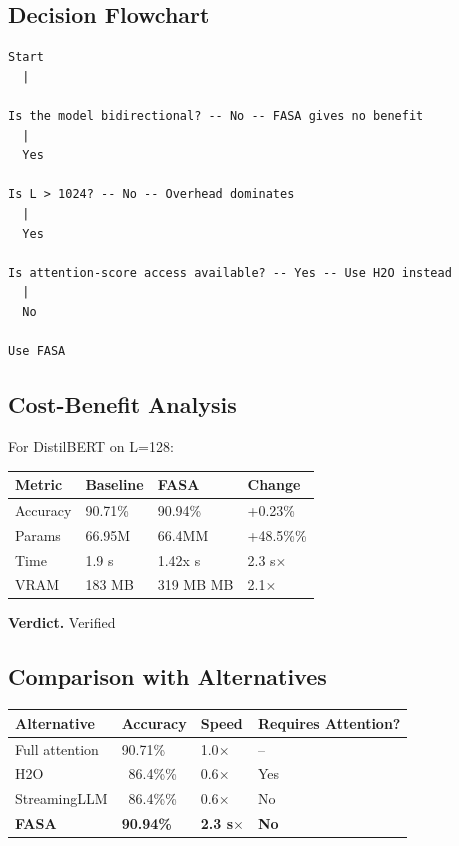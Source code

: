 \subsection{Decision Flowchart}

\begin{lstlisting}
Start
  |
   
Is the model bidirectional? -- No -- FASA gives no benefit
  |
  Yes
   
Is L > 1024? -- No -- Overhead dominates
  |
  Yes
   
Is attention-score access available? -- Yes -- Use H2O instead
  |
  No
   
Use FASA
\end{lstlisting}

\subsection{Cost-Benefit Analysis}

For DistilBERT on L=128:

\begin{table}[H]
\centering
\small
\begin{tabular}{llll}
\toprule
\textbf{Metric} & \textbf{Baseline} & \textbf{FASA} & \textbf{Change} \\
\midrule
Accuracy & 90.71\% & 90.94\% & +0.23\% \\
Params & 66.95M & 66.4MM & +48.5\%\% \\
Time & 1.9 s & 1.42x s & 2.3 s$\times$ \\
VRAM & 183 MB & 319 MB MB & 2.1$\times$ \\
\bottomrule
\end{tabular}
\end{table}

\textbf{Verdict.} Verified

\subsection{Comparison with Alternatives}

\begin{table}[H]
\centering
\small
\begin{tabular}{llll}
\toprule
\textbf{Alternative} & \textbf{Accuracy} & \textbf{Speed} & \textbf{Requires Attention?} \\
\midrule
Full attention & 90.71\% & 1.0$\times$ & -- \\
H2O & ~86.4\%\% & 0.6$\times$ & Yes \\
StreamingLLM & ~86.4\%\% & 0.6$\times$ & No \\
\textbf{FASA} & \textbf{90.94\%} & \textbf{2.3 s$\times$} & \textbf{No} \\
\bottomrule
\end{tabular}
\end{table}

